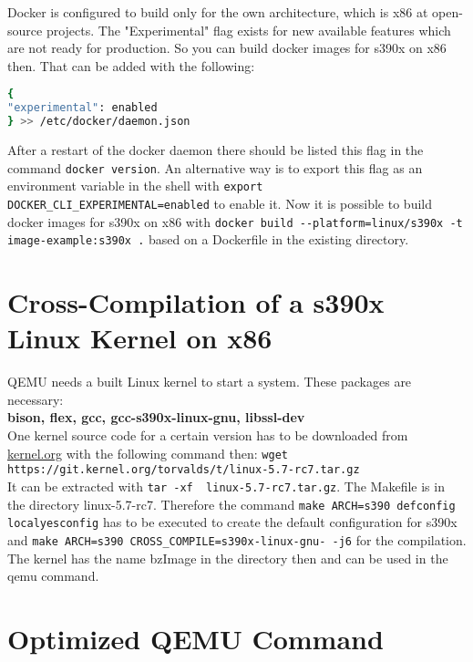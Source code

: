 Docker is configured to build only for the own architecture, which is x86 at open-source projects. The "Experimental" flag exists for new available features which are not ready for production. So you can build docker images for s390x on x86 then. That can be added with the following:

\begin{lstlisting}[language=bash,caption={Docker Experimental Flag},captionpos=b]
{
"experimental": enabled
} >> /etc/docker/daemon.json
\end{lstlisting}

After a restart of the docker daemon there should be listed this flag in the command  \lstinline!docker version!. An alternative way is to export this flag as an environment variable in the shell with  \lstinline!export DOCKER_CLI_EXPERIMENTAL=enabled! to enable it. Now it is possible to build docker images for s390x on x86 with  \lstinline!docker build --platform=linux/s390x -t image-example:s390x .! based on a Dockerfile in the existing directory.

 

 

\section{Cross-Compilation of a s390x Linux Kernel on x86}

QEMU needs a built Linux kernel to start a system. These packages are necessary: \\
\textbf{bison, flex, gcc, gcc-s390x-linux-gnu, libssl-dev} \\
One kernel source code for a certain version has to be downloaded from \url{kernel.org} with the following command then:  \lstinline!wget https://git.kernel.org/torvalds/t/linux-5.7-rc7.tar.gz!\\
It can be extracted with \lstinline!tar -xf  linux-5.7-rc7.tar.gz!. The Makefile is in the directory linux-5.7-rc7. Therefore the command \lstinline!make ARCH=s390 defconfig localyesconfig! has to be executed to create the default configuration for s390x and  \lstinline!make ARCH=s390 CROSS_COMPILE=s390x-linux-gnu- -j6! for the compilation. The kernel has the name bzImage in the directory  then and can be used in the qemu command.

\section{Optimized QEMU Command}

